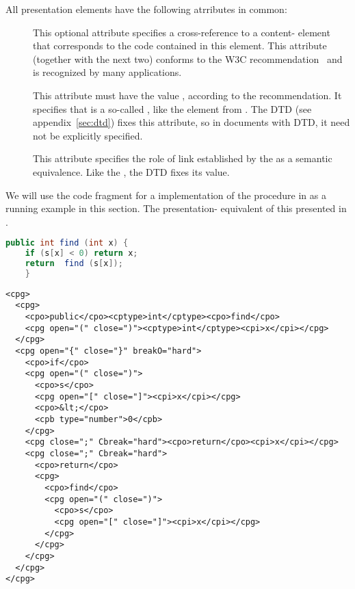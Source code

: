 All presentation {\codeml} elements have the following atrributes in common: 
\begin{description}
\item[] This optional attribute
  specifies a cross-reference to a content-{\codeml} element that corresponds to
  the code contained in this element. This attribute (together with the next two)
  conforms to the W3C {\xlink} recommendation~\cite{DeRMal:xlink01} and is
  recognized by many {\xml} applications. 
\item[] This attribute must have the
  value {}, according to the
  {\xlink} recommendation. It specifies that
  {} is a so-called {}, like the {} element from {\html}. The
  DTD (see appendix~\ref{sec:dtd}) fixes this attribute, so in {\codeml} documents
  with DTD, it need not be explicitly specified.
\item[] This attribute specifies the
  role of link established by the {} as
  a semantic equivalence. Like the {},
  the DTD fixes its value.
\end{description}

We will use the code fragment for a {\java} implementation of the {}
procedure in {} as a running example in this section.  The
presentation-{\codeml} equivalent of this presented in
{}.

\begin{lstlisting}[float,frame=lines,label=lst:find-raw,
   language=java,numbers=none,
   caption={A java code snippet},
   index={find}]
public int find (int x) {
    if (s[x] < 0) return x;
    return  find (s[x]);
    } 
\end{lstlisting}

\begin{lstlisting}[float,frame=lines,label=lst:find-presentation,
   caption={The {\codeml} presentation for the code snippet in {\mylstref{find-raw}}},
   index={[2]cpg,cpo,cptype,code}]
<cpg> 
  <cpg>
    <cpo>public</cpo><cptype>int</cptype><cpo>find</cpo>
    <cpg open="(" close=")"><cptype>int</cptype><cpi>x</cpi></cpg>
  </cpg>
  <cpg open="{" close="}" breakO="hard">
    <cpo>if</cpo>
    <cpg open="(" close=")">
      <cpo>s</cpo>
      <cpg open="[" close="]"><cpi>x</cpi></cpg>
      <cpo>&lt;</cpo>
      <cpb type="number">0</cpb>
    </cpg>
    <cpg close=";" Cbreak="hard"><cpo>return</cpo><cpi>x</cpi></cpg>
    <cpg close=";" Cbreak="hard">
      <cpo>return</cpo>
      <cpg>
        <cpo>find</cpo>
        <cpg open="(" close=")">
          <cpo>s</cpo>
          <cpg open="[" close="]"><cpi>x</cpi></cpg>
        </cpg>
      </cpg>
    </cpg>
  </cpg>
</cpg>
\end{lstlisting}


